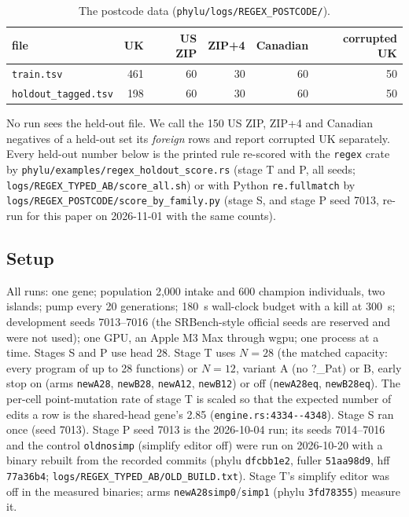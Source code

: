 \documentclass[sigconf,nonacm]{acmart}
\newcommand{\sym}[1]{\textsf{#1}}
\newcommand{\src}[1]{{\small\nolinkurl{#1}}}
\begin{document}
\begin{table}[h]
\caption{The postcode data (\src{phylu/logs/REGEX_POSTCODE/}).}
\label{tab:data}
\footnotesize
\setlength{\tabcolsep}{3pt}
\begin{tabular}{@{}lrrrrr@{}}
\toprule
file & UK & US ZIP & ZIP+4 & Canadian & corrupted UK \\
\midrule
\texttt{train.tsv} & 461 & 60 & 30 & 60 & 50 \\
\src{holdout_tagged.tsv} & 198 & 60 & 30 & 60 & 50 \\
\bottomrule
\end{tabular}
\end{table}

No run sees the held-out file. We call the 150 US ZIP, ZIP+4 and Canadian
negatives of a held-out set its \emph{foreign} rows and report corrupted UK
separately. Every held-out number below is the printed rule re-scored with the
\texttt{regex} crate by \src{phylu/examples/regex_holdout_score.rs}
(stage T and P, all seeds; \src{logs/REGEX_TYPED_AB/score_all.sh}) or with
Python \texttt{re.fullmatch} by \src{logs/REGEX_POSTCODE/score_by_family.py}
(stage S, and stage P seed 7013, re-run for this paper on 2026-11-01 with the same
counts).

\subsection{Setup}

All runs: one gene; population 2{,}000 intake and 600 champion individuals, two
islands; pump every 20 generations; 180~s wall-clock budget with a kill at 300~s;
development seeds 7013--7016 (the SRBench-style official seeds are reserved and
were not used); one GPU, an Apple M3 Max through wgpu; one process at a time.
Stages S and P use head 28. Stage T uses $N=28$ (the matched capacity: every
program of up to 28 functions) or $N=12$, variant A (no \sym{?\_Pat}) or B, early
stop on (arms \texttt{newA28}, \texttt{newB28}, \texttt{newA12},
\texttt{newB12}) or off (\texttt{newA28eq}, \texttt{newB28eq}). The per-cell
point-mutation rate of stage T is scaled so that the expected number of edits a
row is the shared-head gene's 2.85 (\src{engine.rs:4334--4348}). Stage S ran once
(seed 7013). Stage P seed 7013 is the 2026-10-04 run; its seeds 7014--7016 and the
control \texttt{oldnosimp} (simplify editor off) were run on 2026-10-20 with a
binary rebuilt from the recorded commits (phylu \texttt{dfcbb1e2}, fuller
\texttt{51aa98d9}, hff \texttt{77a36b4}; \src{logs/REGEX_TYPED_AB/OLD_BUILD.txt}).
Stage T's simplify editor was off in the measured binaries; arms
\texttt{newA28simp0}/\texttt{simp1} (phylu \texttt{3fd78355}) measure it.
\end{document}
